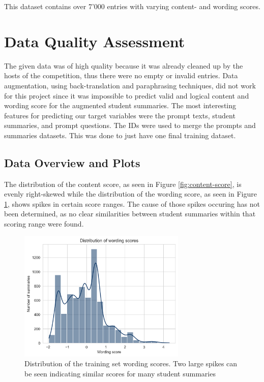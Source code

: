 This dataset contains over 7'000 entries with varying content- and wording scores.


\section{Data Quality Assessment} \label{sec:data-quality-assessment}

The given data was of high quality because it was already cleaned up by the hosts of the competition, thus there were no empty or invalid entries. Data augmentation, using back-translation and paraphrasing techniques, did not work for this project since it was impossible to predict valid and logical content and wording score for the augmented student summaries.
The most interesting features for predicting our target variables were the prompt texts, student summaries, and prompt questions.
The IDs were used to merge the prompts and summaries datasets. This was done to just have one final training dataset.

\subsection{Data Overview and Plots}

The distribution of the content score, as seen in Figure \ref{fig:content-score}, is evenly right-skewed while the distribution of the wording score, as seen in Figure \ref{fig:wording-score}, shows spikes in certain score ranges. The cause of those spikes occuring has not been determined, as no clear similarities between student summaries within that scoring range were found.\\

\begin{figure}[H]
\begin{center}
\includegraphics[width=80mm,scale=0.75]{img/wording_score.png}
\end{center}
\caption[Distribution of Wording scores]{Distribution of the training set wording scores. Two large spikes can be seen indicating similar scores for many student summaries}
\label{fig:wording-score}
\end{figure}

